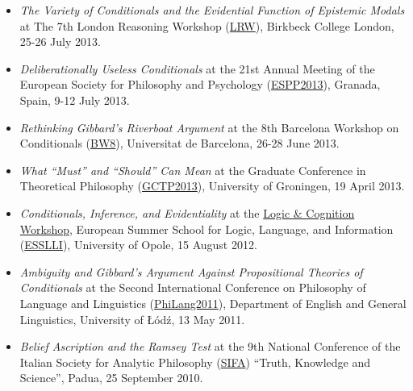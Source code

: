 \documentclass[a4paper,12pt]{article}
\begin{document}
\begin{small}
  \begin{itemize}

  \item \emph{The Variety of Conditionals and the Evidential Function
      of Epistemic Modals} at The 7th London Reasoning Workshop (\href{http://www.bbk.ac.uk/psychology/about-us/events/the-7th-london-reasoning-workshop}{LRW}), Birkbeck
    College London, 25-26 July 2013.

  \item \emph{Deliberationally Useless Conditionals} at the 21st
    Annual Meeting of the European Society for Philosophy and
    Psychology (\href{http://espp2013.com}{ESPP2013}), Granada, Spain,
    9-12 July 2013.

  \item \emph{Rethinking Gibbard’s Riverboat Argument} at the 8th
    Barcelona Workshop on Conditionals
    (\href{http://www.ub.edu/logosbw/bw8/index.html}{BW8}),
    Universitat de Barcelona, 26-28 June 2013.
    
  \item \emph{What ``Must'' and ``Should'' Can Mean} at the Graduate
    Conference in Theoretical Philosophy
    (\href{http://www.philos.rug.nl/GCTP2013/}{GCTP2013}), University
    of Groningen, 19 April
    2013. %
    
  \item \emph{Conditionals, Inference, and Evidentiality} at the
    \href{http://www.ai.rug.nl/SocialCognition/logic-cognition/}{Logic
      \& Cognition Workshop}, European Summer School for Logic,
    Language, and Information
    (\href{http://www.esslli2012.pl}{ESSLLI}), University of Opole, 15
    August
    2012. %

  \item \emph{Ambiguity and Gibbard's Argument Against Propositional
      Theories of Conditionals} at the Second International Conference
    on Philosophy of Language and Linguistics
    (\href{http://ia.uni.lodz.pl/linguistics/events/philang-2011}{PhiLang2011}),
    Department of English and General Linguistics, University of Łódź,
    13 May
    2011. %

  \item \emph{Belief Ascription and the Ramsey Test} at the 9th
    National Conference of the Italian Society for Analytic Philosophy
    (\href{http://www.filosofia.lettere.unipd.it/analitica/sifa2010/}{SIFA})
    ``Truth, Knowledge and Science'', Padua, 25 September
    2010. %


\end{itemize}
\end{small}
\end{document}
